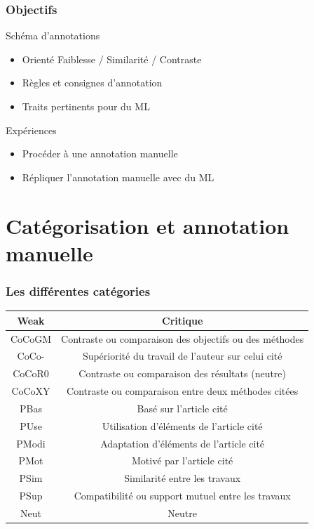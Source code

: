 \documentclass[10pt]{beamer}
\begin{document}
\begin{frame}
  \frametitle{Objectifs}
  
  \begin{block}{Schéma d'annotations}
  \begin{itemize}
    \item Orienté Faiblesse / Similarité / Contraste
    \item Règles et consignes d'annotation
    \item Traits pertinents pour du ML
  \end{itemize}
  \end{block}
  
  \begin{block}{Expériences}
  \begin{itemize}
  	\item Procéder à une annotation manuelle
    \item Répliquer l'annotation manuelle avec du ML
  \end{itemize}
  \end{block}
\end{frame}

\section{Catégorisation et annotation manuelle}
\label{sec:catandmanual}


\begin{frame}
  \frametitle{Les différentes catégories}

	\begin{tabular}{| c | c |}
		\hline
		Weak & Critique \\
		\hline
		CoCoGM & Contraste ou comparaison des objectifs ou des méthodes \\
		CoCo- &  Supériorité du travail de l'auteur sur celui cité \\
		CoCoR0 & Contraste ou comparaison des résultats (neutre) \\
		CoCoXY & Contraste ou comparaison entre deux méthodes citées \\
		\hline
		PBas & Basé sur l'article cité \\
		PUse & Utilisation d'éléments de l'article cité \\
		PModi & Adaptation d'éléments de l'article cité \\
		PMot & Motivé par l'article cité \\
		PSim & Similarité entre les travaux \\
		PSup & Compatibilité ou support mutuel entre les travaux \\
		\hline
		Neut & Neutre \\
		\hline
	\end{tabular}
\end{frame}
\end{document}
